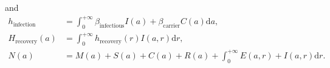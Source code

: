 \documentclass[12pt]{article}
\newcommand{\md}{\mathrm{d}}
\begin{document}
and
\begin{equation}
  \begin{split}
    h_{\text{infection}}
    &= \int_0^{+\infty} \beta_{\text{infectious}} I(a)
    + \beta_{\text{carrier}} C(a) \md a,
    \\
    H_{\text{recovery}}(a)
    &= \int_0^{+\infty}h_{\text{recovery}}(r) I(a, r) \md r,
    \\
    N(a) &= M(a) + S(a) + C(a) + R(a)
    + \int_0^{+\infty} E(a, r) + I(a, r) \md r.
  \end{split}
\end{equation}





\end{document}
